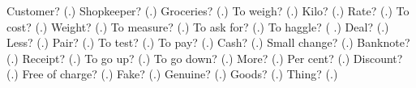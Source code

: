 \begin{tcolorbox}[breakable,colback=teal!4,colframe=teal!35!black,title={Before you move on}]
Customer? (\textbf{}.) Shopkeeper? (\textbf{}.) Groceries? (\textbf{}.) To weigh? (\textbf{}.) Kilo? (\textbf{}.) Rate? (\textbf{}.) To cost? (\textbf{}.) Weight? (\textbf{}.) To measure? (\textbf{}.) To ask for? (\textbf{}.) To haggle? (\textbf{ }.) Deal? (\textbf{}.) Less? (\textbf{}.) Pair? (\textbf{}.) To test? (\textbf{}.) To pay? (\textbf{}.) Cash? (\textbf{}.) Small change? (\textbf{}.) Banknote? (\textbf{}.) Receipt? (\textbf{}.) To go up? (\textbf{}.) To go down? (\textbf{}.) More? (\textbf{}.) Per cent? (\textbf{}.) Discount? (\textbf{}.) Free of charge? (\textbf{}.) Fake? (\textbf{}.) Genuine? (\textbf{}.) Goods? (\textbf{}.) Thing? (\textbf{}.)
\end{tcolorbox}
